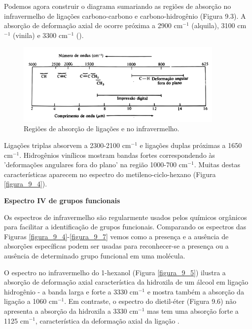 Podemos agora construir o diagrama sumariando as regiões de absorção no infravermelho de ligações carbono-carbono e carbono-hidrogênio (Figura 9.3). A absorção de deformação axial de  ocorre próxima a 2900 cm$^{-1}$ (alquila), 3100 cm$^{-1}$ (vinila) e 3300 cm$^{-1}$ ().

\begin{figure}[H]
    \centering
    \includegraphics[width=0.9\textwidth,angle=0]{content/images/Figura_9_3.pdf}
    \caption{Regiões de absorção de ligações  e  no infravermelho.}
    \label{figura_9.3}
\end{figure}

Ligações triplas absorvem a 2300-2100 cm$^{-1}$ e ligações duplas próximas a 1650 cm$^{-1}$. Hidrogênios vinílicos mostram bandas fortes correspondendo às 'deformações angulares fora do plano' na região 1000-700 cm$^{-1}$. Muitas destas características aparecem no espectro do metileno-ciclo-hexano (Figura \ref{figura_9_4}).

\noindent\textbf{Espectro IV de grupos funcionais}

\noindent Os espectros de infravermelho são regularmente usados pelos químicos orgânicos para facilitar a identificação de grupos funcionais. Comparando os espectros das Figuras \ref{figura_9_4}-\ref{figura_9_7} vemos como a presença e a ausência de absorções específicas podem ser usadas para reconhecer-se a presença ou a ausência de determinado grupo funcional em uma molécula.

O espectro no infravermelho do 1-hexanol (Figura \ref{figura_9_5}) ilustra a absorção de deformação axial característica da hidroxila de um álcool em ligação hidrogênio - a banda larga e forte a 3330 cm$^{-1}$ e mostra também a absorção da ligação  a 1060 cm$^{-1}$. Em contraste, o espectro do dietil-éter (Figura 9.6) não apresenta a absorção da hidroxila a 3330 cm$^{-1}$ mas tem uma absorção forte a 1125 cm$^{-1}$, característica da deformação axial da ligação .

